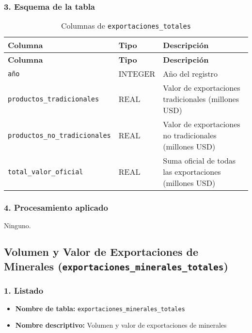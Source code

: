 \documentclass[12pt,a4paper]{article}
\begin{document}
\subsubsection*{3. Esquema de la tabla}
\begin{longtable}{@{}lll@{}}
\caption{Columnas de \texttt{exportaciones\_totales}}\\
\toprule
\textbf{Columna}                      & \textbf{Tipo} & \textbf{Descripción} \\
\midrule
\endfirsthead
\toprule
\textbf{Columna}                      & \textbf{Tipo} & \textbf{Descripción} \\
\midrule
\endhead
\bottomrule
\endfoot
\texttt{año}                           & INTEGER & Año del registro \\
\texttt{productos\_tradicionales}      & REAL    & Valor de exportaciones tradicionales (millones USD) \\
\texttt{productos\_no\_tradicionales}   & REAL    & Valor de exportaciones no tradicionales (millones USD) \\
\texttt{total\_valor\_oficial}         & REAL    & Suma oficial de todas las exportaciones (millones USD) \\
\end{longtable}

\subsubsection*{4. Procesamiento aplicado}
Ninguno.

\newpage
\subsection{Volumen y Valor de Exportaciones de Minerales (\texttt{exportaciones\_minerales\_totales})}

\subsubsection*{1. Listado}
\begin{itemize}
  \item \textbf{Nombre de tabla:} \texttt{exportaciones\_minerales\_totales}
  \item \textbf{Nombre descriptivo:} Volumen y valor de exportaciones de minerales
\end{itemize}
\end{document}
